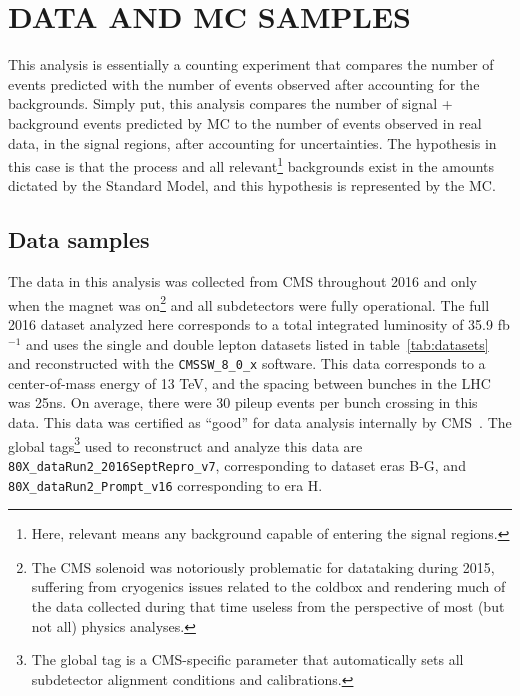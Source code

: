 %
%

\chapter{DATA AND MC SAMPLES}
This analysis is essentially a counting experiment that compares the number of \tth events predicted with the number of events observed after accounting for the backgrounds.
Simply put, this analysis compares the number of signal + background events predicted by MC to the number of events observed in real data, in the signal regions, after accounting for uncertainties. 
The hypothesis in this case is that the \tth process and all relevant\footnote{Here, relevant means any background capable of entering the signal regions.} backgrounds exist in the amounts dictated by
the Standard Model, and this hypothesis is represented by the MC. 

\section{Data samples}
The data in this analysis was collected from CMS throughout 2016 and only when the magnet was on\footnote{The CMS solenoid was notoriously problematic for datataking during 2015,
suffering from cryogenics issues related to the coldbox and rendering much of the data collected during that time useless from the perspective of most (but not all) physics analyses.}
and all subdetectors were fully operational.
The full 2016 dataset analyzed here corresponds to a total integrated luminosity of 35.9 fb$^{-1}$ and uses the single and double lepton datasets listed in table~\ref{tab:datasets}
and reconstructed with the \texttt{CMSSW\_8\_0\_x} software. This data corresponds to a center-of-mass energy of 13 TeV, and the spacing between bunches in the LHC was 25ns.
On average, there were 30 pileup events per bunch crossing in this data. This data was certified as ``good'' for data analysis internally by CMS~\cite{json}.
The global tags\footnote{The global tag is a CMS-specific parameter that automatically sets all subdetector alignment conditions and calibrations.} used to reconstruct and analyze this data are
\texttt{80X\_dataRun2\_2016SeptRepro\_v7}, corresponding to dataset eras B-G, and \texttt{80X\_dataRun2\_Prompt\_v16} corresponding to era H.

